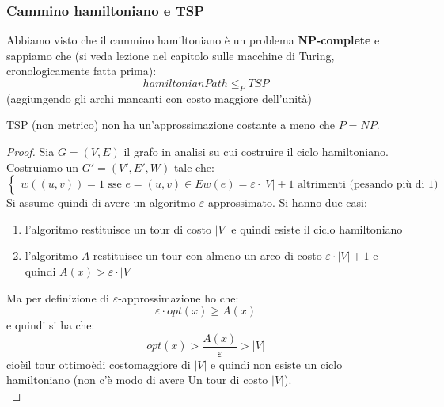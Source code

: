 																      	\subsubsection{Cammino hamiltoniano e TSP}
																      	Abbiamo visto che il cammino hamiltoniano è un problema \textbf{NP-complete} e
																      	sappiamo che (si veda lezione nel capitolo sulle macchine di Turing,
																      	cronologicamente fatta prima):
																      	\[hamiltonianPath\leq_P TSP\]
																      	(aggiungendo gli archi mancanti con costo maggiore dell'unità)
																      	\begin{teorema}
																      		TSP (non metrico) non ha un'approssimazione costante a meno che $P=NP$.
																      	\end{teorema}
																      	\begin{proof}
																      		Sia $G=(V,E)$ il grafo in analisi su cui costruire il ciclo hamiltoniano.
																      		Costruiamo un
																      		$G'=(V', E', W)$ tale che:
																      		\[
																      			\begin{cases}
																      				w((u,v)) = 1\mbox{ sse } e=(u,v) \in E                            
																      				w(e)=\varepsilon\cdot|V|+1 \mbox{ altrimenti (pesando più di 1)} 
																      			\end{cases}
																      		\]
																      		Si assume quindi  di avere un algoritmo $\varepsilon$-approssimato.
																      		Si hanno due casi:
																      		\begin{enumerate}
																      			\item l'algoritmo restituisce un tour di costo $|V|$ e quindi esiste il
																      			      ciclo hamiltoniano
																      			\item l'algoritmo $A$ restituisce un tour con almeno un arco di costo
																      			      $\varepsilon\cdot|V|+1$ e quindi $A(x)>\varepsilon\cdot |V|$
																      		\end{enumerate}
																      		Ma per definizione di $\varepsilon$-approssimazione ho che:
																      		\[\varepsilon\cdot opt(x)\geq A(x)\]
																      		e quindi si ha che:
																      		\[opt(x)>\frac{A(x)}{\varepsilon}>|V|\]
																      		cioèil tour ottimoèdi costomaggiore di $|V|$ e quindi non esiste un ciclo
																      		hamiltoniano (non c’è modo di avere Un tour di costo $|V|$).\\

\end{proof}
